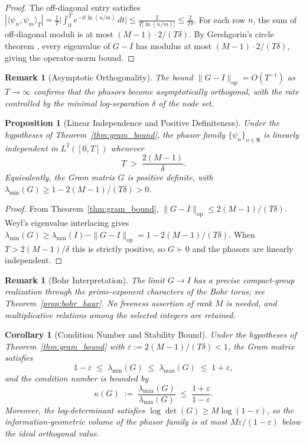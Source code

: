 \documentclass[11pt]{article}
\newtheorem{proposition}[theorem]{Proposition}
\newtheorem{corollary}[theorem]{Corollary}
\newtheorem{remark}[theorem]{Remark}
\begin{document}
\begin{proof}
The off-diagonal entry satisfies
$|\langle\psi_n,\psi_m\rangle_T|
 = \tfrac{1}{T}\bigl|\int_0^T e^{-it\ln(n/m)}\,dt\bigr|
 \le \tfrac{2}{T|\ln(n/m)|}
 \le \tfrac{2}{T\delta}$.
For each row $n$, the sum of off-diagonal moduli is at most $(M-1)\cdot 2/(T\delta)$.
By Gershgorin's circle theorem \cite{Gershgorin1931}, every eigenvalue of $G-I$
has modulus at most $(M-1)\cdot 2/(T\delta)$, giving the operator-norm bound.
\end{proof}

\begin{remark}[Asymptotic Orthogonality]
The bound $\|G-I\|_{\mathrm{op}} = O(T^{-1})$ as $T\to\infty$ confirms that the
phasors become asymptotically orthogonal, with the rate controlled by the minimal
log-separation $\delta$ of the node set.
\end{remark}

\begin{proposition}[Linear Independence and Positive Definiteness]
\label{prop:lin_indep}
Under the hypotheses of Theorem~\ref{thm:gram_bound}, the phasor family
$\{\psi_n\}_{n\in\mathbf{S}}$ is linearly independent in $L^2([0,T])$
whenever
\[
  T \;>\; \frac{2(M-1)}{\delta}.
\]
Equivalently, the Gram matrix $G$ is positive definite, with
$\lambda_{\min}(G) \ge 1 - 2(M-1)/(T\delta) > 0$.
\end{proposition}

\begin{proof}
From Theorem~\ref{thm:gram_bound}, $\|G-I\|_{\mathrm{op}} \le 2(M-1)/(T\delta)$.
Weyl's eigenvalue interlacing gives
$\lambda_{\min}(G) \ge \lambda_{\min}(I) - \|G-I\|_{\mathrm{op}}
= 1 - 2(M-1)/(T\delta)$.
When $T > 2(M-1)/\delta$ this is strictly positive, so $G \succ 0$ and the
phasors are linearly independent.
\end{proof}

\begin{remark}[Bohr Interpretation]
The limit $G\to I$ has a precise compact-group realization through the
prime-exponent characters of the Bohr torus; see
Theorem~\ref{prop:bohr_haar}.  No freeness assertion of rank $M$ is needed,
and multiplicative relations among the selected integers are retained.
\end{remark}

\begin{corollary}[Condition Number and Stability Bound]
\label{cor:condition_number}
Under the hypotheses of Theorem~\ref{thm:gram_bound} with
$\varepsilon := 2(M-1)/(T\delta) < 1$, the Gram matrix satisfies
\[
  1-\varepsilon \;\le\; \lambda_{\min}(G)
  \;\le\; \lambda_{\max}(G) \;\le\; 1+\varepsilon,
\]
and the condition number is bounded by
\[
  \kappa(G) \;:=\; \frac{\lambda_{\max}(G)}{\lambda_{\min}(G)}
  \;\le\; \frac{1+\varepsilon}{1-\varepsilon}.
\]
Moreover, the log-determinant satisfies
$\log\det(G) \ge M\log(1-\varepsilon)$,
so the information-geometric volume of the phasor family is at most
$M\varepsilon/(1-\varepsilon)$ below the ideal orthogonal value.
\end{corollary}
\end{document}
